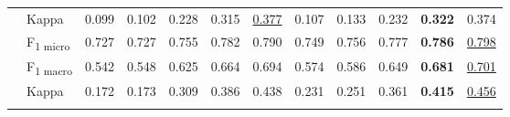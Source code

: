 \begin{table}
\begin{tabular}{ l l l l l l l l l l l l}
& Kappa & 0.099 & 0.102 & 0.228 & 0.315 & \underline{0.377} & 0.107 & 0.133 & 0.232 & \textbf{0.322} & 0.374 \\ \addlinespace[2ex]
\midrule
\addlinespace[2ex]
\multirow{3}{*}{Average}  & F\textsubscript{1 micro} & 0.727 & 0.727 & 0.755 & 0.782 & 0.790 & 0.749 & 0.756 & 0.777 & \textbf{0.786} & \underline{0.798} \\ & F\textsubscript{1 macro} & 0.542 & 0.548 & 0.625 & 0.664 & 0.694 & 0.574 & 0.586 & 0.649 & \textbf{0.681} & \underline{0.701} \\ & Kappa & 0.172 & 0.173 & 0.309 & 0.386 & 0.438 & 0.231 & 0.251 & 0.361 & \textbf{0.415} & \underline{0.456} \\ \addlinespace[2ex]
\bottomrule
\end{tabular}
\label{tab:res1}
\end{table}

